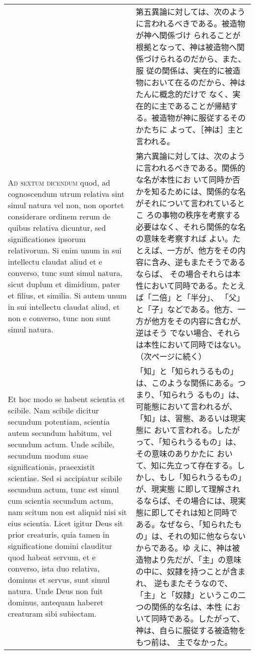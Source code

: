 \documentclass[paper=a4paper,fontsize=10pt,jafontsize=9pt,titlepage]{jlreq}
\begin{document}
\begin{longtable}{p{21em}p{21em}}
&

第五異論に対しては、次のように言われるべきである。被造物が神へ関係づけ
られることが根拠となって、神は被造物へ関係づけられるのだから、また、服
従の関係は、実在的に被造物において在るのだから、神はたんに概念的だけで
なく、実在的に主であることが帰結する。被造物が神に服従するそのかたちに
よって、［神は］主と言われる。

\\

{\scshape Ad sextum dicendum} quod, ad cognoscendum utrum relativa
sint simul natura vel non, non oportet considerare ordinem rerum de
quibus relativa dicuntur, sed significationes ipsorum relativorum. Si
enim unum in sui intellectu claudat aliud et e converso, tunc sunt
simul natura, sicut duplum et dimidium, pater et filius, et
similia. Si autem unum in sui intellectu claudat aliud, et non e
converso, tunc non sunt simul natura.

&

第六異論に対しては、次のように言われるべきである。関係的な名が本性にお
いて同時か否かを知るためには、関係的な名がそれについて言われているとこ
ろの事物の秩序を考察する必要はなく、それら関係的な名の意味を考察すれば
よい。たとえば、一方が、他方をその内容に含み、逆もまたそうであるならば、
その場合それらは本性において同時である。たとえば「二倍」と「半分」、
「父」と「子」などである。他方、一方が他方をその内容に含むが、逆はそう
でない場合、それらは本性において同時ではない。（次ページに続く）

\\

Et hoc modo se habent scientia et scibile. Nam scibile dicitur
secundum potentiam, scientia autem secundum habitum, vel secundum
actum. Unde scibile, secundum modum suae significationis, praeexistit
scientiae. Sed si accipiatur scibile secundum actum, tunc est simul
cum scientia secundum actum, nam scitum non est aliquid nisi sit eius
scientia. Licet igitur Deus sit prior creaturis, quia tamen in
significatione domini clauditur quod habeat servum, et e converso,
ista duo relativa, dominus et servus, sunt simul natura. Unde Deus non
fuit dominus, antequam haberet creaturam sibi subiectam.

&

「知」と「知られうるもの」は、このような関係にある。つまり、「知られう
るもの」は、可能態において言われるが、「知」は、習態、あるいは現実態に
おいて言われる。したがって、「知られうるもの」は、その意味のありかたに
おいて、知に先立って存在する。しかし、もし「知られうるもの」が、現実態
に即して理解されるならば、その場合には、現実態に即してそれは知と同時で
ある。なぜなら、「知られたもの」は、それの知に他ならないからである。ゆ
えに、神は被造物より先だが、「主」の意味の中に、奴隷を持つことが含まれ、
逆もまたそうなので、「主」と「奴隷」というこの二つの関係的な名は、本性
において同時である。したがって、神は、自らに服従する被造物をもつ前は、
主でなかった。

\end{longtable}
\newpage
{}
\end{document}
